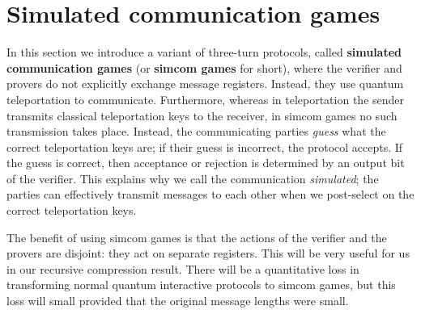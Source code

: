\section{Simulated communication games}
\label{sec:prelim_simcom}

In this section we introduce a variant of three-turn protocols, called \textbf{simulated communication games} (or \textbf{simcom games} for short), where the verifier and provers do not explicitly exchange message registers. Instead, they use quantum teleportation to communicate. Furthermore, whereas in teleportation the sender transmits classical teleportation keys to the receiver, in simcom games no such transmission takes place. Instead, the communicating parties \emph{guess} what the correct teleportation keys are; if their guess is incorrect, the protocol accepts. If the guess is correct, then acceptance or rejection is determined by an output bit of the verifier. This explains why we call the communication \emph{simulated}; the parties can effectively transmit messages to each other when we post-select on the correct teleportation keys.

The benefit of using simcom games is that the actions of the verifier and the provers are disjoint: they act on separate registers. This will be very useful for us in our recursive compression result. There will be a quantitative loss in transforming normal quantum interactive protocols to simcom games, but this loss will small provided that the original message lengths were small. 


